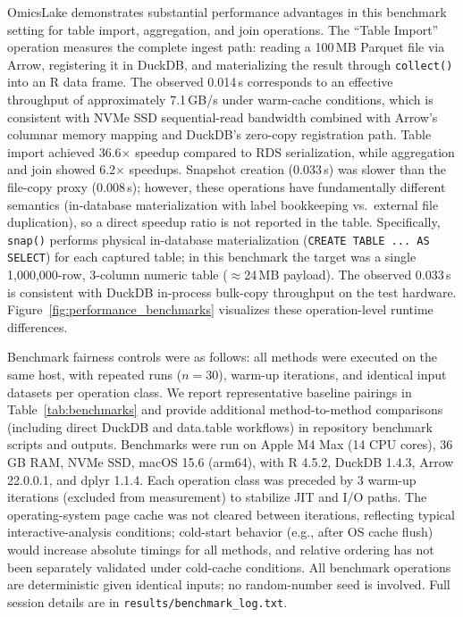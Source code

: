 \documentclass[11pt,a4paper]{article}
\begin{document}
OmicsLake demonstrates substantial performance advantages in this benchmark setting for table import, aggregation, and join operations. The ``Table Import'' operation measures the complete ingest path: reading a 100\,MB Parquet file via Arrow, registering it in DuckDB, and materializing the result through \texttt{collect()} into an R data frame. The observed 0.014\,s corresponds to an effective throughput of approximately 7.1\,GB/s under warm-cache conditions, which is consistent with NVMe SSD sequential-read bandwidth combined with Arrow's columnar memory mapping and DuckDB's zero-copy registration path. Table import achieved 36.6$\times$ speedup compared to RDS serialization, while aggregation and join showed 6.2$\times$ speedups. Snapshot creation (0.033\,s) was slower than the file-copy proxy (0.008\,s); however, these operations have fundamentally different semantics (in-database materialization with label bookkeeping vs.\ external file duplication), so a direct speedup ratio is not reported in the table.
Specifically, \texttt{snap()} performs physical in-database materialization (\texttt{CREATE TABLE ... AS SELECT}) for each captured table; in this benchmark the target was a single 1{,}000{,}000-row, 3-column numeric table ($\approx$24\,MB payload). The observed 0.033\,s is consistent with DuckDB in-process bulk-copy throughput on the test hardware.
Figure~\ref{fig:performance_benchmarks} visualizes these operation-level runtime differences.

Benchmark fairness controls were as follows: all methods were executed on the same host, with repeated runs ($n=30$), warm-up iterations, and identical input datasets per operation class. We report representative baseline pairings in Table~\ref{tab:benchmarks} and provide additional method-to-method comparisons (including direct DuckDB and data.table workflows) in repository benchmark scripts and outputs. Benchmarks were run on Apple M4 Max (14 CPU cores), 36 GB RAM, NVMe SSD, macOS 15.6 (arm64), with R 4.5.2, DuckDB 1.4.3, Arrow 22.0.0.1, and dplyr 1.1.4. Each operation class was preceded by 3 warm-up iterations (excluded from measurement) to stabilize JIT and I/O paths. The operating-system page cache was not cleared between iterations, reflecting typical interactive-analysis conditions; cold-start behavior (e.g., after OS cache flush) would increase absolute timings for all methods, and relative ordering has not been separately validated under cold-cache conditions. All benchmark operations are deterministic given identical inputs; no random-number seed is involved. Full session details are in \texttt{results/benchmark\_log.txt}.
\end{document}
